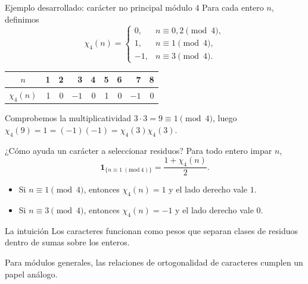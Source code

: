 \documentclass[aspectratio=169,11pt]{beamer}
\begin{document}
\begin{frame}{Ejemplo desarrollado: carácter no principal módulo $4$}
    Para cada entero $n$, definimos
    \[
      \chi_4(n)=
      \begin{cases}
        0,&n\equiv0,2\pmod4,\\
        1,&n\equiv1\pmod4,\\
        -1,&n\equiv3\pmod4.
      \end{cases}
    \]
    \begin{center}
      \begin{tabular}{c|rrrrrrrr}
        $n$&1&2&3&4&5&6&7&8\\\hline
        $\chi_4(n)$&1&0&$-1$&0&1&0&$-1$&0
      \end{tabular}
    \end{center}
    \begin{exampleblock}{Comprobemos la multiplicatividad}
        $3\cdot3=9\equiv1\pmod4$, luego $\chi_4(9)=1=(-1)(-1)=\chi_4(3)\chi_4(3)$.
    \end{exampleblock}
\end{frame}

\begin{frame}{¿Cómo ayuda un carácter a seleccionar residuos?}
    Para todo entero impar $n$,
    \[
      \mathbf{1}_{\{n\equiv1\ (\mathrm{mod}\ 4)\}}=\frac{1+\chi_4(n)}{2}.
    \]
    \begin{itemize}
        \item Si $n\equiv1\pmod4$, entonces $\chi_4(n)=1$ y el lado derecho vale $1$.
        \item Si $n\equiv3\pmod4$, entonces $\chi_4(n)=-1$ y el lado derecho vale $0$.
    \end{itemize}
    \begin{block}{La intuición}
        Los caracteres funcionan como pesos que separan clases de residuos dentro de sumas sobre los enteros.
    \end{block}
    \centering\small Para módulos generales, las relaciones de ortogonalidad de caracteres cumplen un papel análogo.\;\cite[Capítulo 6]{Apostol1976-xj}
\end{frame}
\end{document}
